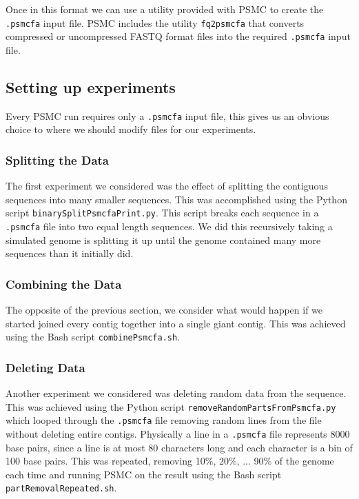 \documentclass[11pt,a4paper]{article}
\begin{document}
Once in this format we can use a utility provided with PSMC to create the \verb|.psmcfa| input file. PSMC includes the utility \verb|fq2psmcfa| that converts compressed or uncompressed FASTQ format files into the required \verb|.psmcfa| input file.

\subsection{Setting up experiments} %
Every PSMC run requires only a \verb|.psmcfa| input file, this gives us an obvious choice to where we should modify files for our experiments. 

\subsubsection{Splitting the Data}
The first experiment we considered was the effect of splitting the contiguous sequences into many smaller sequences. This was accomplished using the Python script \verb|binarySplitPsmcfaPrint.py|. This script breaks each sequence in a \verb|.psmcfa| file into two equal length sequences. We did this recursively taking a simulated genome is splitting it up until the genome contained many more sequences than it initially did. 

\subsubsection{Combining the Data}
The opposite of the previous section, we consider what would happen if we started joined every contig together into a single giant contig. This was achieved using the Bash script \verb|combinePsmcfa.sh|. 

\subsubsection{Deleting Data}
Another experiment we considered was deleting random data from the sequence. This was achieved using the Python script \verb|removeRandomPartsFromPsmcfa.py| which looped through the \verb|.psmcfa| file removing random lines from the file without deleting entire contigs. Physically a line in a \verb|.psmcfa| file represents 8000 base pairs, since a line is at most 80 characters long and each character is a bin of 100 base pairs. This was repeated, removing 10\%, 20\%, ... 90\% of the genome each time and running PSMC on the result using the Bash script \verb|partRemovalRepeated.sh|.
\end{document}
